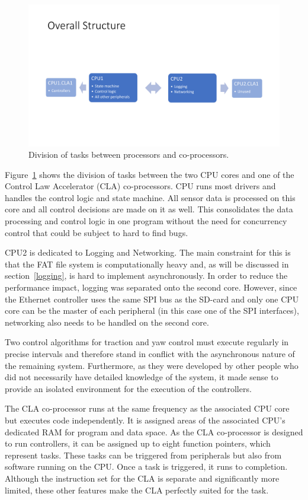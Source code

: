 \begin{figure}[H]
    \centering \includegraphics[width=1.0\textwidth]{./figures/system_structure.pdf}
    \caption{Division of tasks between processors and co-processors.}
    \label{fig:system_structure}
\end{figure}

Figure~\ref{fig:system_structure} shows the division of tasks between the two CPU cores and one of the Control Law Accelerator (CLA) co-processors. CPU runs most drivers and handles the control logic and state machine. All sensor data is processed on this core and all control decisions are made on it as well. This consolidates the data processing and control logic in one program without the need for concurrency control that could be subject to hard to find bugs.

CPU2 is dedicated to Logging and Networking. The main constraint for this is that the FAT file system is computationally heavy and, as will be discussed in section~\ref{logging}, is hard to implement asynchronously. In order to reduce the performance impact, logging was separated onto the second core. However, since the Ethernet controller uses the same SPI bus as the SD-card and only one CPU core can be the master of each peripheral (in this case one of the SPI interfaces), networking also needs to be handled on the second core.

Two control algorithms for traction and yaw control must execute regularly in precise intervals and therefore stand in conflict with the asynchronous nature of the remaining system. Furthermore, as they were developed by other people who did not necessarily have detailed knowledge of the system, it made sense to provide an isolated environment for the execution of the controllers.

The CLA co-processor runs at the same frequency as the associated CPU core but executes code independently. It is assigned areas of the associated CPU's dedicated RAM for program and data space. As the CLA co-processor is designed to run controllers, it can be assigned up to eight function pointers, which represent tasks. These tasks can be triggered from peripherals but also from software running on the CPU. Once a task is triggered, it runs to completion. Although the instruction set for the CLA is separate and significantly more limited, these other features make the CLA perfectly suited for the task.

